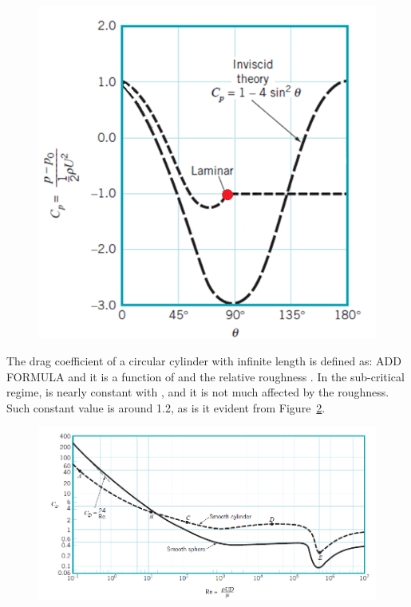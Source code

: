 \documentclass[12pt]{article}
\begin{document}
 \begin{figure}[!ht]
                \includegraphics[width=\textwidth]{Pressure_Distribution.png}
                \centering
                \caption{}
                \label{fig:p_d}
        \end{figure}


The drag coefficient of a circular cylinder with infinite length is defined as: ADD FORMULA and it is a function of  and the relative roughness . In the sub-critical regime,  is nearly constant with , and it is not much affected by the roughness. Such constant value is around 1.2, as is it evident from Figure~\ref{fig:dragtrend}.

\begin{figure}[!ht]
                \includegraphics[width=\textwidth]{DragCoefficient_Trend.png}
                \centering
                \caption{}
                \label{fig:dragtrend}
        \end{figure}
\end{document}
